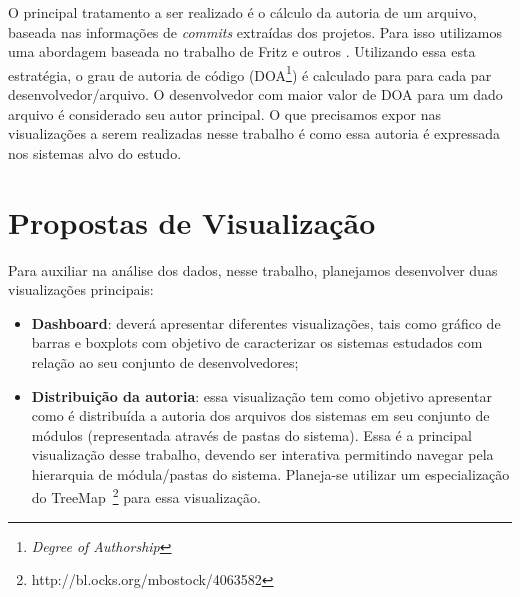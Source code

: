 \documentclass[12pt]{article}
\begin{document}
O principal tratamento a ser realizado é o cálculo da autoria de um arquivo, baseada nas informações de \textit{commits} extraídas dos projetos. Para isso utilizamos uma abordagem baseada no trabalho de Fritz e outros \cite{Fritz2014}. Utilizando essa esta estratégia, o grau de autoria de código (DOA\footnote{\textit{Degree of Authorship}}) é calculado para para cada par desenvolvedor/arquivo. O desenvolvedor com maior valor de DOA para um dado arquivo é considerado seu autor principal. O que precisamos expor nas visualizações a serem realizadas nesse trabalho é como essa autoria é expressada nos sistemas alvo do estudo.


\section{Propostas de Visualização}

Para auxiliar na análise dos dados, nesse trabalho, planejamos desenvolver duas visualizações principais:
\begin{itemize}
    \item \textbf{Dashboard}: deverá apresentar diferentes visualizações, tais como gráfico de barras e boxplots com objetivo de caracterizar os sistemas estudados com relação ao seu conjunto de desenvolvedores;
    \item \textbf{Distribuição da autoria}: essa visualização tem como objetivo apresentar como é distribuída a autoria dos arquivos dos sistemas em seu conjunto de módulos (representada através de pastas do sistema). Essa é a principal visualização desse trabalho, devendo ser interativa permitindo navegar pela hierarquia de módula/pastas do sistema. Planeja-se utilizar um especialização do TreeMap~\footnote{http://bl.ocks.org/mbostock/4063582} para essa visualização. 
\end{itemize}
\footnotesize


\end{document}
